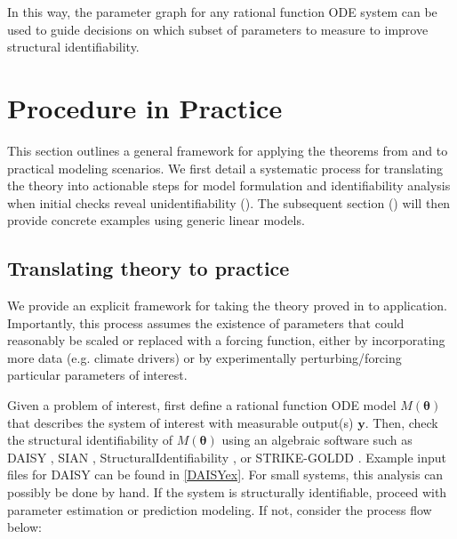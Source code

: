 \documentclass[a4paper,fleqn]{cas-dc}
\theoremstyle{definition}
\begin{document}
\noindent In this way, the parameter graph for any rational function ODE system can be used to guide decisions on which subset of parameters to measure to improve structural identifiability.

\section{Procedure in Practice} \label{s:method}
\noindent This section outlines a general framework for applying the theorems from  and  to practical modeling scenarios. We first detail a systematic process for translating the theory into actionable steps for model formulation and identifiability analysis when initial checks reveal unidentifiability (). The subsequent section () will then provide concrete examples using generic linear models.

\subsection{Translating theory to practice} \label{s:translating_theory}
\noindent We provide an explicit framework for taking the theory proved in  to application.
Importantly, this process assumes the existence of parameters that could reasonably be scaled or replaced with a forcing function, either by incorporating more data (e.g. climate drivers) or by experimentally perturbing/forcing particular parameters of interest.

Given a problem of interest, first define a rational function ODE model $M(\pmb{\theta})$ that describes the system of interest with measurable output(s) $\pmb{y}$.
Then, check the structural identifiability of $M(\pmb{\theta})$ using an algebraic software such as DAISY \cite{bellu2007daisy}, SIAN \cite{hong2019sian}, StructuralIdentifiability \cite{dong2023differential}, or STRIKE-GOLDD \cite{diaz2023strike}.
Example input files for DAISY can be found in \cref{DAISYex}.
For small systems, this analysis can possibly be done by hand.
If the system is structurally identifiable, proceed with parameter estimation or prediction modeling. If not, consider the process flow below:
\end{document}
